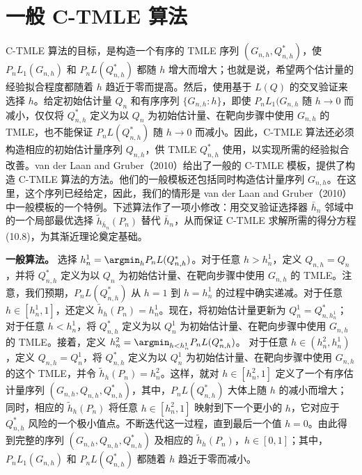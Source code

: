 \section{一般 C-TMLE 算法}
\label{sec:ch10-general-algorithm}

C-TMLE 算法的目标，是构造一个有序的 TMLE 序列 $(G_{n,h},Q_{n,h}^*)$，使 $P_nL_1(G_{n,h})$ 和 $P_nL(Q_{n,h}^*)$ 都随 $h$ 增大而增大；也就是说，希望两个估计量的经验拟合程度都随着 $h$ 趋近于零而提高。然后，使用基于 $L(Q)$ 的交叉验证来选择 $h$。给定初始估计量 $Q_n$ 和有序序列 $\{G_{n,h}:h\}$，即使 $P_nL_1(G_{n,h}$ 随 $h\to0$ 而减小，仅仅将 $Q_{n,h}^*$ 定义为以 $Q_n$ 为初始估计量、在靶向步骤中使用 $G_{n,h}$ 的 TMLE，也不能保证 $P_nL(Q_{n,h}^*)$ 随 $h\to0$ 而减小。因此，C-TMLE 算法还必须构造相应的初始估计量序列 $Q_{n,h}$，供 TMLE $Q_{n,h}^*$ 使用，以实现所需的经验拟合改善。van der Laan and Gruber（2010）给出了一般的 C-TMLE 模板，提供了构造 C-TMLE 算法的方法。他们的一般模板还包括同时构造估计量序列 $G_{n,h}$。在这里，这个序列已经给定，因此，我们的情形是 van der Laan and Gruber（2010）中一般模板的一个特例。下述算法作了一项小修改：用交叉验证选择器 $\bar h_n$ 邻域中的一个局部最优选择 $\tilde h_{\bar h_n}(P_n)$ 替代 $\bar h_n$，从而保证 C-TMLE 求解所需的得分方程 (10.8)，为其渐近理论奠定基础。

\noindent\textbf{一般算法。}
选择 $h_n^1=\argmin_hP_nL(Q_{n,h}^*)$。对于任意 $h>h_n^1$，定义 $Q_{n,h}=Q_n$，并将 $Q_{n,h}^*$ 定义为以 $Q_n$ 为初始估计量、在靶向步骤中使用 $G_{n,h}$ 的 TMLE。注意，我们预期，$P_nL(Q_{n,h}^*)$ 从 $h=1$ 到 $h=h_n^1$ 的过程中确实递减。对于任意 $h\in[h_n^1,1]$，还定义 $\tilde h_h(P_n)=h_n^1$。现在，将初始估计量更新为 $Q_n^1=Q_{n,h_n^1}^*$；对于任意 $h<h_n^1$，将 $Q_{n,h}^*$ 定义为以 $Q_n^1$ 为初始估计量、在靶向步骤中使用 $G_{n,h}$ 的 TMLE。接着，定义
$h_n^2=\argmin_{h<h_n^1}P_nL(Q_{n,h}^*)$。
对于任意 $h\in(h_n^2,h_n^1)$，定义 $Q_{n,h}=Q_n^1$，将 $Q_{n,h}^*$ 定义为以 $Q_n^1$ 为初始估计量、在靶向步骤中使用 $G_{n,h}$ 的这个 TMLE，并令 $\tilde h_h(P_n)=h_n^2$。这样，就对 $h\in[h_n^2,1]$ 定义了一个有序估计量序列 $(G_{n,h},Q_{n,h},Q_{n,h}^*)$，其中，$P_nL(Q_{n,h}^*)$ 大体上随 $h$ 的减小而增大；同时，相应的 $\tilde h_h(P_n)$ 将任意 $h\in[h_n^2,1]$ 映射到下一个更小的 $h$，它对应于 $Q_{n,h}^*$ 风险的一个极小值点。不断迭代这一过程，直到最后一个值 $h=0$。由此得到完整的序列 $(G_{n,h},Q_{n,h},Q_{n,h}^*)$ 及相应的 $\tilde h_h(P_n)$，$h\in[0,1]$；其中，$P_nL_1(G_{n,h})$ 和 $P_nL(Q_{n,h}^*)$ 都随着 $h$ 趋近于零而减小。

